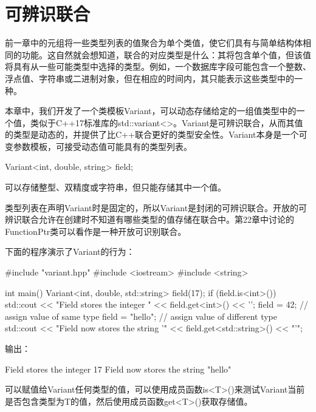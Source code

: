 \chapter{可辨识联合}
前一章中的元组将一些类型列表的值聚合为单个类值，使它们具有与简单结构体相同的功能。这自然就会想知道，联合的对应类型是什么：其将包含单个值，但该值将具有从一些可能类型中选择的类型。例如，一个数据库字段可能包含一个整数、浮点值、字符串或二进制对象，但在相应的时间内，其只能表示这些类型中的一种。

本章中，我们开发了一个类模板Variant，可以动态存储给定的一组值类型中的一个值，类似于C++17标准库的std::variant<>。Variant是可辨识联合，从而其值的类型是动态的，并提供了比C++联合更好的类型安全性。Variant本身是一个可变参数模板，可接受动态值可能具有的类型列表。

\begin{cpp}
Variant<int, double, string> field;
\end{cpp}

可以存储整型、双精度或字符串，但只能存储其中一个值。

\begin{notice}
类型列表在声明Variant时是固定的，所以Variant是封闭的可辨识联合。开放的可辨识联合允许在创建时不知道有哪些类型的值存储在联合中。第22章中讨论的FunctionPtr类可以看作是一种开放可识别联合。
\end{notice}

下面的程序演示了Variant的行为：

\begin{cpp}
#include "variant.hpp"
#include <iostream>
#include <string>
 
int main()
{
	Variant<int, double, std::string> field(17);
	if (field.is<int>()) {
		std::cout << "Field stores the integer "
				<< field.get<int>() << '\n';
	}
	field = 42; // assign value of same type
	field = "hello"; // assign value of different type
	std::cout << "Field now stores the string '"
			<< field.get<std::string>() << "'\n";
}
\end{cpp}

输出：

\begin{shell}
Field stores the integer 17
Field now stores the string "hello"
\end{shell}

可以赋值给Variant任何类型的值，可以使用成员函数is<T>()来测试Variant当前是否包含类型为T的值，然后使用成员函数get<T>()获取存储值。






































